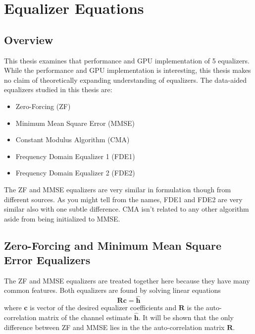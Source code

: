 
\chapter{Equalizer Equations}
\label{chap:eq_eq}

\section{Overview}
This thesis examines that performance and GPU implementation of 5 equalizers.
While the performance and GPU implementation is interesting, this thesis makes no claim of theoretically expanding understanding of equalizers.
The data-aided equalizers studied in this thesis are:
\begin{itemize}
\item Zero-Forcing (ZF)
\item Minimum Mean Square Error (MMSE)
\item Constant Modulus Algorithm (CMA)
\item Frequency Domain Equalizer 1 (FDE1)
\item Frequency Domain Equalizer 2 (FDE2)
\end{itemize}

The ZF and MMSE equalizers are very similar in formulation though from different sources.
As you might tell from the names, FDE1 and FDE2 are very similar also with one subtle difference.
CMA isn't related to any other algorithm aside from being initialized to MMSE.

\section{Zero-Forcing and Minimum Mean Square Error Equalizers}

The ZF and MMSE equalizers are treated together here because they have many common features.
Both equalizers are found by solving linear equations
\begin{equation}
\mathbf{R}\mathbf{c} = \hat{\mathbf{h}}
\end{equation}
where $\mathbf{c}$ is vector of the desired equalizer coefficients
and $\mathbf{R}$ is the auto-correlation matrix of the channel estimate $\hat{\mathbf{h}}$.
It will be shown that the only difference between ZF and MMSE lies in the the auto-correlation matrix $\mathbf{R}$.

